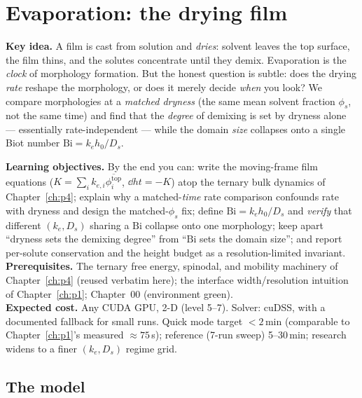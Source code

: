 \chapter{Evaporation: the drying film}
\label{ch:p5}

\begin{keybox}
\textbf{Key idea.} A film is cast from solution and \emph{dries}: solvent
leaves the top surface, the film thins, and the solutes concentrate until
they demix. Evaporation is the \emph{clock} of morphology formation. But
the honest question is subtle: does the drying \emph{rate} reshape the
morphology, or does it merely decide \emph{when} you look? We compare
morphologies at a \emph{matched dryness} (the same mean solvent fraction
$\phi_s$, not the same time) and find that the \emph{degree} of demixing
is set by dryness alone --- essentially rate-independent --- while the
domain \emph{size} collapses onto a single Biot number
$\mathrm{Bi}=k_e h_0/D_s$.
\end{keybox}

\begin{keybox}
\textbf{Learning objectives.} By the end you can: write the moving-frame
film equations ($K=\sum_i k_{e,i}\overline{\phi_i^{\text{top}}}$,
$\dd{h}{t}=-K$) atop the ternary bulk dynamics of
Chapter~\ref{ch:p4}; explain why a matched-\emph{time} rate comparison
confounds rate with dryness and design the matched-$\phi_s$ fix; define
$\mathrm{Bi}=k_e h_0/D_s$ and \emph{verify} that different $(k_e,D_s)$
sharing a $\mathrm{Bi}$ collapse onto one morphology; keep apart
``dryness sets the demixing degree'' from ``$\mathrm{Bi}$ sets the domain
size''; and report per-solute conservation and the height budget as a
resolution-limited invariant.\\[2pt]
\textbf{Prerequisites.} The ternary free energy, spinodal, and mobility
machinery of Chapter~\ref{ch:p4} (reused verbatim here); the interface
width/resolution intuition of Chapter~\ref{ch:p1}; Chapter~00
(environment green).\\[2pt]
\textbf{Expected cost.} Any CUDA GPU, 2-D (level 5--7). Solver: cuDSS,
with  a documented fallback for small runs. Quick mode
target $<2$\,min (comparable to Chapter~\ref{ch:p1}'s measured
$\approx75$\,s); reference (7-run sweep) 5--30\,min; research widens to a
finer $(k_e,D_s)$ regime grid.
\end{keybox}

\section{The model}

